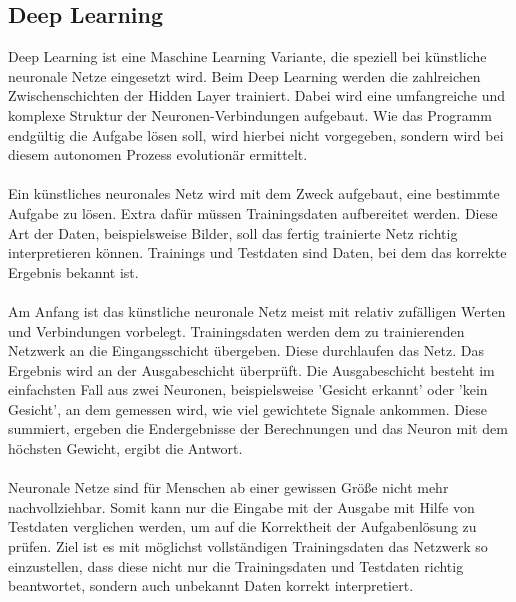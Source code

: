 \documentclass[12pt,oneside,a4paper,parskip]{scrbook}
\begin{document}
\subsection{Deep Learning}
Deep Learning ist eine Maschine Learning Variante, die speziell bei künstliche neuronale Netze eingesetzt wird. Beim Deep Learning werden die zahlreichen Zwischenschichten der Hidden Layer trainiert. Dabei wird eine umfangreiche und komplexe Struktur der Neuronen-Verbindungen aufgebaut. Wie das Programm endgültig die Aufgabe lösen soll, wird hierbei nicht vorgegeben, sondern wird bei diesem autonomen Prozess evolutionär ermittelt.
\\\\
Ein künstliches neuronales Netz wird mit dem Zweck aufgebaut, eine bestimmte Aufgabe zu lösen. Extra dafür müssen Trainingsdaten aufbereitet werden. Diese Art der Daten, beispielsweise Bilder, soll das fertig trainierte Netz richtig interpretieren können. Trainings und Testdaten sind Daten, bei dem das korrekte Ergebnis bekannt ist.
\\\\
Am Anfang ist das künstliche neuronale Netz meist mit relativ zufälligen Werten und Verbindungen vorbelegt. Trainingsdaten werden dem zu trainierenden Netzwerk an die Eingangsschicht übergeben. Diese durchlaufen das Netz. Das Ergebnis wird an der Ausgabeschicht überprüft. Die Ausgabeschicht besteht im einfachsten Fall aus zwei Neuronen, beispielsweise 'Gesicht erkannt' oder 'kein Gesicht', an dem gemessen wird, wie viel gewichtete Signale ankommen. Diese summiert, ergeben die Endergebnisse der Berechnungen und das Neuron mit dem höchsten Gewicht, ergibt die Antwort.
\\\\
Neuronale Netze sind für Menschen ab einer gewissen Größe nicht mehr nachvollziehbar. Somit kann nur die Eingabe mit der Ausgabe mit Hilfe von Testdaten verglichen werden, um auf die Korrektheit der Aufgabenlösung zu prüfen. Ziel ist es mit möglichst vollständigen Trainingsdaten das Netzwerk so einzustellen, dass diese nicht nur die Trainingsdaten und Testdaten richtig beantwortet, sondern auch unbekannt Daten korrekt interpretiert.
\end{document}
